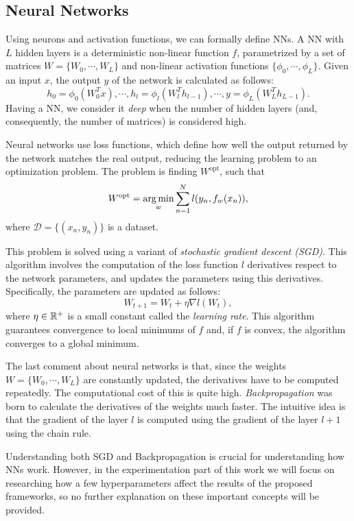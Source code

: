 \subsection{Neural Networks}

Using neurons and activation functions, we can formally define NNs. A NN with $L$ hidden layers is a deterministic non-linear function $f$, parametrized by a set of matrices $W = \{W_0,\cdots,W_L\}$ and non-linear activation functions $\{\phi_0,\cdots,\phi_L\}$. Given an input $x$, the output $y$ of the network is calculated as follows:
\[
h_0 = \phi_0\left(W_0^Tx\right), \cdots, h_l = \phi_l\left(W_l^T h_{l-1}\right),\cdots, y = \phi_L\left(W_L^T h_{L-1}\right).
\]
Having a NN, we consider it \emph{deep} when the number of hidden layers (and, consequently, the number of matrices) is considered high. 

Neural networks use loss functions, which define how well the output returned by the network matches the real output, reducing the learning problem to an optimization problem. The problem is finding $W^{\operatorname{opt}}$, such that
\[
W^{\operatorname{opt}}   = \operatorname*{arg\,min}_{w} \sum_{n = 1}^N l(y_n, f_w(x_n)),
\]
where $\mathcal D = \{(x_n,y_n)\}$ is a dataset.

This problem is solved using a variant of \emph{stochastic gradient descent (SGD)}. This algorithm involves the computation of the loss function $l$ derivatives respect to the network parameters, and updates the parameters using this derivatives. Specifically, the parameters are updated as follows:
\[
W_{t+1} = W_t + \eta \nabla l(W_t),
\]
where $\eta \in \mathbb{R}^+$ is a small constant called the \emph{learning rate}. This algorithm guarantees convergence to local minimums of $f$ and, if $f$ is convex, the algorithm converges to a global minimum.

The last comment about neural networks is that, since the weights $W = \{W_0,\cdots,W_L\}$ are constantly updated, the derivatives have to be computed repeatedly. The computational cost of this is quite high. \emph{Backpropagation} was born to calculate the derivatives of the weights much faster. The intuitive idea is that the gradient of the layer $l$ is computed using the gradient of the layer $l+1$ using the chain rule.

Understanding both SGD and Backpropagation is crucial for understanding how NNs  work. However, in the experimentation part of this work we will focus on researching how a few hyperparameters affect the results of the proposed frameworks, so no further explanation on these important concepts will be provided.

